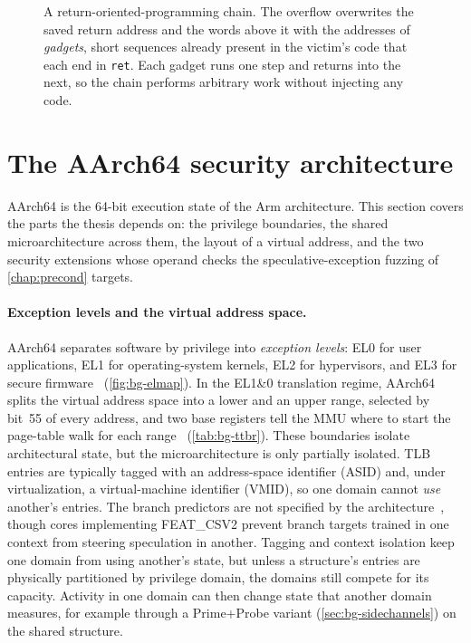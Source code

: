 \begin{figure}[h]
\centering
\fitwidth{}
\caption{A return-oriented-programming chain. The overflow overwrites the saved return address and
the words above it with the addresses of \emph{gadgets}, short sequences already present in the
victim's code that each end in \texttt{ret}. Each gadget runs one step and returns into the next,
so the chain performs arbitrary work without injecting any code.}
\label{fig:bg-rop}
\end{figure}

\section{The AArch64 security architecture}
\label{sec:bg-aarch64}

AArch64 is the 64-bit execution state of the Arm architecture. This section covers the parts the
thesis depends on: the privilege boundaries, the shared microarchitecture across them, the layout
of a virtual address, and the two security extensions whose operand checks the speculative-exception fuzzing of \autoref{chap:precond} targets.

\paragraph{Exception levels and the virtual address space.}
AArch64 separates software by privilege into \emph{exception levels}: EL0 for user applications,
EL1 for operating-system kernels, EL2 for hypervisors, and EL3 for secure
firmware~\cite{arm_exception_levels} (\autoref{fig:bg-elmap}). In the EL1\&0 translation regime,
AArch64 splits the virtual address space into a lower and an upper range, selected by bit~55 of
every address, and two base registers tell the MMU where to start the page-table walk for each
range~\cite{arm64pagetables} (\autoref{tab:bg-ttbr}). These boundaries isolate
architectural state, but the microarchitecture is only partially isolated. TLB entries are
typically tagged with an address-space identifier (ASID) and, under virtualization, a
virtual-machine identifier (VMID), so one domain cannot \emph{use} another's entries. The branch
predictors are not specified by the architecture~\cite{chen2024dissectingconditionalbranchpredictors},
though cores implementing FEAT\_CSV2 prevent branch targets trained in one context from steering
speculation in another. Tagging and context isolation keep one domain from using another's
state, but unless a structure's entries are physically partitioned by privilege domain, the domains
still compete for its capacity. Activity in one domain can then change state that another domain
measures, for example through a Prime+Probe variant (\autoref{sec:bg-sidechannels}) on the shared
structure.

